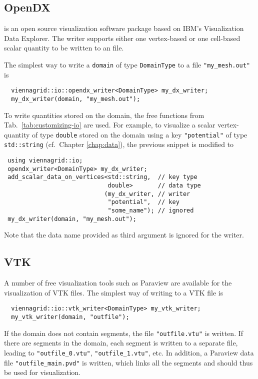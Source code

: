 
 \subsection{OpenDX}
 {\OpenDX} \cite{opendx} is an open source visualization software package based on IBM's Visualization Data Explorer.
 The writer supports either one vertex-based or one cell-based scalar quantity to be written to an {\OpenDX} file.

 The simplest way to write a \lstinline|domain| of type \lstinline|DomainType| to a file \lstinline|"my_mesh.out"| is
 \begin{lstlisting}
  viennagrid::io::opendx_writer<DomainType> my_dx_writer;
  my_dx_writer(domain, "my_mesh.out");
 \end{lstlisting}
 To write quantities stored on the domain, the free functions from Tab.~\ref{tab:customizing-io} are used.
 For example, to visualize a scalar vertex-quantity of type \lstinline|double| stored on the domain using a key \lstinline|"potential"| of type \lstinline|std::string| (cf.~Chapter \ref{chap:data}), the previous snippet is modified to
 \begin{lstlisting}
 using viennagrid::io;
 opendx_writer<DomainType> my_dx_writer;
 add_scalar_data_on_vertices<std::string,  // key type
                             double>       // data type
                            (my_dx_writer, // writer
                             "potential",  // key
                             "some_name"); // ignored
 my_dx_writer(domain, "my_mesh.out");
 \end{lstlisting}
 Note that the data name provided as third argument is ignored for the {\OpenDX} writer.


 \subsection{VTK}
 A number of free visualization tools such as Paraview \cite{paraview} are available for the visualization of VTK files.
 The simplest way of writing to a VTK file is 
 \begin{lstlisting}
  viennagrid::io::vtk_writer<DomainType> my_vtk_writer;
  my_vtk_writer(domain, "outfile");
 \end{lstlisting}
 If the domain does not contain segments, the file \lstinline|"outfile.vtu"| is written. If there are segments in the domain,
 each segment is written to a separate file, leading to \lstinline|"outfile_0.vtu"|, \lstinline|"outfile_1.vtu"|, etc. In addition,
 a Paraview data file \lstinline|"outfile_main.pvd"| is written, which links all the segments and should thus be used for visualization.


